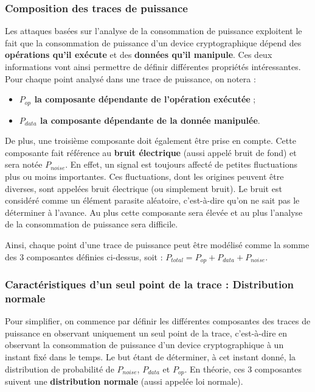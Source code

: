 \documentclass[10pt, oneside, a4paper]{article}
\begin{document}
\subsubsection{Composition des traces de puissance}
Les attaques basées sur l'analyse de la consommation de puissance exploitent le fait que la consommation de puissance d'un device cryptographique dépend des \textbf{opérations qu'il exécute} et des \textbf{données qu'il manipule}. Ces deux informations vont ainsi permettre de définir différentes propriétés intéressantes. Pour chaque point analysé dans une trace de puissance, on notera :
\begin{itemize}
\item \textbf{$P_{op}$ la composante dépendante de l'opération exécutée} ;
\item \textbf{$P_{data}$ la composante dépendante de la donnée manipulée}. \\
\end{itemize}
De plus, une troisième composante doit également être prise en compte. Cette composante fait référence au \textbf{bruit électrique} (aussi appelé bruit de fond) et sera notée \textbf{$P_{noise}$}. En effet, un signal est toujours affecté de petites fluctuations plus ou moins importantes. Ces fluctuations, dont les origines peuvent être diverses, sont appelées bruit électrique (ou simplement bruit). Le bruit est considéré comme un élément parasite aléatoire, c'est-à-dire qu'on ne sait pas le déterminer à l'avance. Au plus cette composante sera élevée et au plus l'analyse de la consommation de puissance sera difficile.

Ainsi, chaque point d'une trace de puissance peut être modélisé comme la somme des 3 composantes définies ci-dessus, soit : 
$P_{total} = P_{op} + P_{data} + P_{noise}$.

\subsubsection{Caractéristiques d'un seul point de la trace : Distribution normale}
\label{subsubsection:distribution}

Pour simplifier, on commence par définir les différentes composantes des traces de puissance en observant uniquement un seul point de la trace, c'est-à-dire en observant la consommation de puissance d'un device cryptographique à un instant fixé dans le temps. Le but étant de déterminer, à cet instant donné, la distribution de probabilité de $P_{noise}$, $P_{data}$ et $P_{op}$.
En théorie, ces 3 composantes suivent une \textbf{distribution normale} (aussi appelée loi normale).
\end{document}
